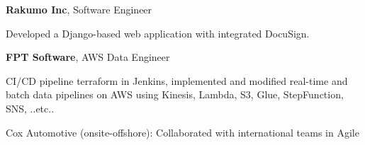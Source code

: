 


\begin{twocolentry}{
	}
	\textbf{Rakumo Inc}, Software Engineer
	\begin{highlights}
		\item Developed a Django-based web application with integrated DocuSign.
	\end{highlights}
\end{twocolentry}

\begin{twocolentry}{
	}
	\textbf{FPT Software}, AWS Data Engineer
	
	\begin{highlights}
		\item CI/CD pipeline terraform in Jenkins, implemented and modified real-time and batch data pipelines on AWS using Kinesis, Lambda, S3, Glue, StepFunction, SNS, ..etc..
		\item Cox Automotive (onsite-offshore): Collaborated with international teams in Agile
	\end{highlights}
	
	
\end{twocolentry}

